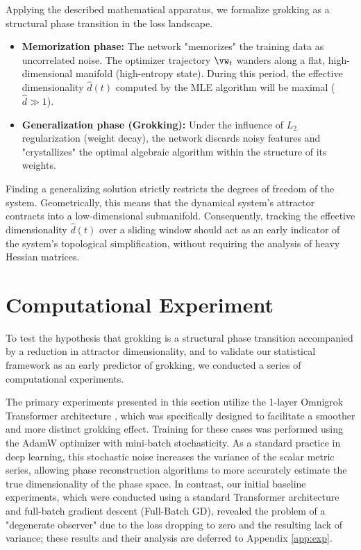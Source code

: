 \documentclass{article}
\begin{document}
Applying the described mathematical apparatus, we formalize grokking as a structural phase transition in the loss landscape.
\begin{itemize}
    \item \textbf{Memorization phase:} The network "memorizes" the training data as uncorrelated noise. The optimizer trajectory $\vw_t$ wanders along a flat, high-dimensional manifold (high-entropy state). During this period, the effective dimensionality $\hat{d}(t)$ computed by the MLE algorithm will be maximal ($\hat{d} \gg 1$).
    \item \textbf{Generalization phase (Grokking):} Under the influence of $L_2$ regularization (weight decay), the network discards noisy features and "crystallizes" the optimal algebraic algorithm within the structure of its weights.
\end{itemize}

Finding a generalizing solution strictly restricts the degrees of freedom of the system. Geometrically, this means that the dynamical system's attractor contracts into a low-dimensional submanifold. Consequently, tracking the effective dimensionality $\hat{d}(t)$ over a sliding window should act as an early indicator of the system's topological simplification, without requiring the analysis of heavy Hessian matrices.










\section{Computational Experiment}\label{sec:exp}

To test the hypothesis that grokking is a structural phase transition accompanied by a reduction in attractor dimensionality, and to validate our statistical framework as an early predictor of grokking, we conducted a series of computational experiments.

The primary experiments presented in this section utilize the 1-layer Omnigrok Transformer architecture \cite{liu2022omnigrok}, which was specifically designed to facilitate a smoother and more distinct grokking effect. Training for these cases was performed using the AdamW optimizer with mini-batch stochasticity. As a standard practice in deep learning, this stochastic noise increases the variance of the scalar metric series, allowing phase reconstruction algorithms to more accurately estimate the true dimensionality of the phase space. In contrast, our initial baseline experiments, which were conducted using a standard Transformer architecture and full-batch gradient descent (Full-Batch GD), revealed the problem of a "degenerate observer" due to the loss dropping to zero and the resulting lack of variance; these results and their analysis are deferred to Appendix \ref{app:exp}.
\end{document}
